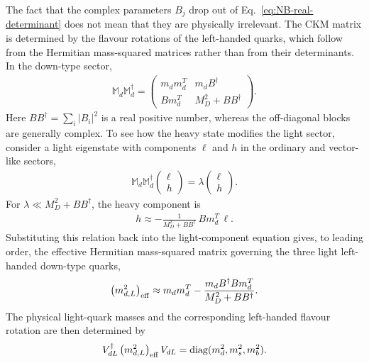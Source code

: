 \documentclass[review]{elsarticle}
\numberwithin{equation}{section}
\numberwithin{table}{section}
\numberwithin{figure}{section}
\begin{document}
The fact that the complex parameters $B_j$ drop out of Eq.~\eqref{eq:NB-real-determinant} does not mean that they are physically irrelevant. The CKM matrix is determined by the flavour rotations of the left-handed quarks, which follow from the Hermitian mass-squared matrices rather than from their determinants. In the down-type sector,
\begin{align}
    \mathbb{M}_d\mathbb{M}_d^\dagger
    =
    \begin{pmatrix}
        m_dm_d^T & m_dB^\dagger \\
        Bm_d^T & M_D^2+BB^\dagger
    \end{pmatrix}.
    \label{eq:NB-MMdagger}
\end{align}
Here $BB^\dagger=\sum_i|B_i|^2$ is a real positive number, whereas the off-diagonal blocks are generally complex. To see how the heavy state modifies the light sector, consider a light eigenstate with components $\ell$ and $h$ in the ordinary and vector-like sectors,
\begin{align}
    \mathbb{M}_d\mathbb{M}_d^\dagger
    \begin{pmatrix}
        \ell\\
        h
    \end{pmatrix}
    =
    \lambda
    \begin{pmatrix}
        \ell\\
        h
    \end{pmatrix}.
\end{align}
For $\lambda\ll M_D^2+BB^\dagger$, the heavy component is
\begin{align}
    h\approx -\frac{1}{M_D^2+BB^\dagger}\,
    Bm_d^T\,\ell .
    \label{eq:NB-heavy-component}
\end{align}
Substituting this relation back into the light-component equation gives, to leading order, the effective Hermitian mass-squared matrix governing the three light left-handed down-type quarks,
\begin{align}
    \left(m_{d,L}^2\right)_{\rm eff}
    \approx
    m_dm_d^T-\frac{m_dB^\dagger Bm_d^T}{M_D^2+BB^\dagger}.
    \label{eq:NB-effective-Hd}
\end{align}
The physical light-quark masses and the corresponding left-handed flavour rotation are then determined by
\begin{align}
    V_{dL}^\dagger\left(m_{d,L}^2\right)_{\rm eff}V_{dL}
    =
    {\rm diag}(m_d^2,m_s^2,m_b^2).
    \label{eq:NB-diagonal-light-masses}
\end{align}
\end{document}
